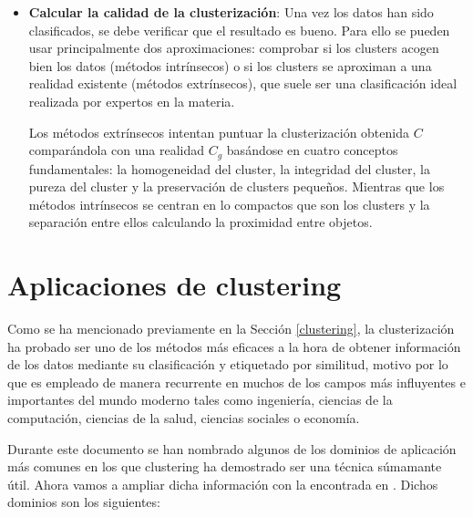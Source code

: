 \documentclass[10pt, a4paper]{article}
\begin{document}
\begin{itemize}
  \item \textbf{Calcular la calidad de la clusterización}: Una vez los datos han sido clasificados, se debe verificar que el resultado es bueno. Para ello se pueden usar principalmente dos aproximaciones: comprobar si los clusters acogen bien los datos (métodos intrínsecos)  o si los clusters se aproximan a una realidad existente (métodos extrínsecos), que suele ser una clasificación ideal realizada por expertos en la materia. 
  
  Los métodos extrínsecos intentan puntuar la clusterización obtenida $C$ comparándola con una realidad $C_g$ basándose en cuatro conceptos fundamentales: la homogeneidad del cluster, la integridad del cluster, la pureza del cluster y la preservación de clusters pequeños. Mientras que los métodos intrínsecos se centran en lo compactos que son los clusters y la separación entre ellos calculando la proximidad entre objetos.
\end{itemize}



\section{Aplicaciones de clustering} \label{sec:aplicaciones}

Como se ha mencionado previamente en la Sección \ref{clustering}, la clusterización ha probado ser uno de los métodos más eficaces a la hora de obtener información de los datos mediante su clasificación y etiquetado por similitud, motivo por lo que es empleado de manera recurrente en muchos de los campos más influyentes e importantes del mundo moderno tales como ingeniería, ciencias de la computación, ciencias de la salud, ciencias sociales o economía. 

Durante este documento se han nombrado algunos de los dominios de aplicación más comunes en los que clustering ha demostrado ser una técnica súmamante útil. Ahora vamos a ampliar dicha información con la encontrada en \cite{otrolibro}. Dichos dominios son los siguientes:
\end{document}
